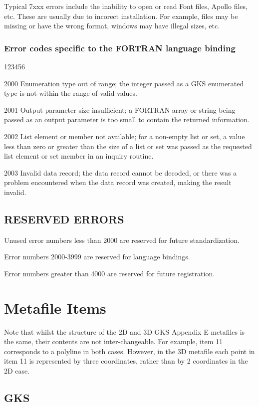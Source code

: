 Typical 7xxx errors include the inability to open or read Font files,
Apollo  files, etc. These are usually due to
incorect installation. For example, files may be missing or have the
wrong format, windows may have illegal sizes, etc.
\subsection{Error codes specific to the FORTRAN language binding}
\begin{DLtt}{123456}
\item[2000]Enumeration type out of range; the integer passed as a
GKS enumerated type is not within the range of valid values.
\item[2001]Output parameter size insufficient; a FORTRAN array or
string being passed as an output parameter is too small to contain
the returned information.
\item[2002]List element or member not available; for a non-empty
list or set, a value less than zero or greater than the size of a
list or set was passed as the requested list element or set
member in an inquiry routine.
\item[2003]Invalid data record; the data record cannot be decoded,
or there was a problem encountered when the data record was
created, making the result invalid.
\end{DLtt}
\section{RESERVED ERRORS}
 
Unused error numbers less than 2000 are reserved for
future standardization.
 
Error numbers 2000-3999 are reserved for language bindings.
 
Error numbers greater than 4000 are reserved for future registration.
\chapter{\protect\label{sec:metitm}Metafile Items}
 
Note that whilst the structure of the 2D and 3D GKS Appendix E metafiles
is the same, their contents are not inter-changeable. For example, item 11
corresponds to a polyline in both cases. However, in the 3D metafile each
point in item 11 is represented by three coordinates, rather than by 2
coordinates in the 2D case.
\section{GKS}
 
